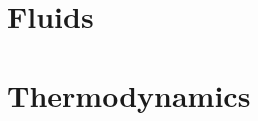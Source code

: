 \documentclass{hdnotes}
\begin{document}
\part{Fluids}








\part{Thermodynamics}





\end{document}
